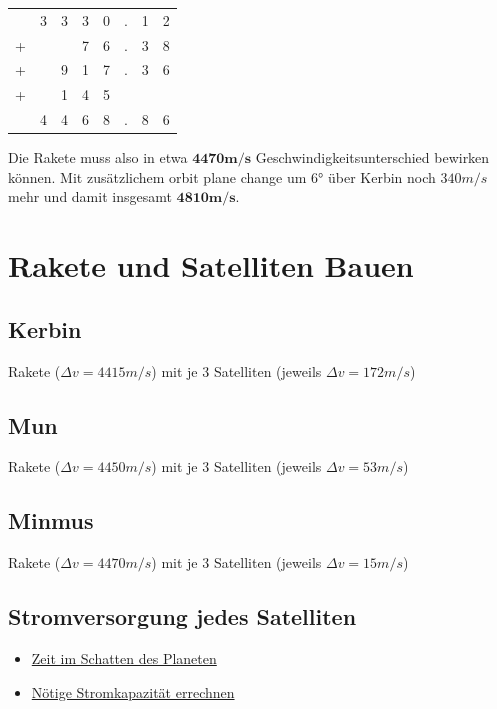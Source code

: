 \documentclass[12pt,paper=A4,numbers=noenddot,bibliography=totoc,listof=totoc,DIV=11,BCOR=1mm]{scrreprt}
\newcommand{\gq}[1]{\glqq #1\grqq} %
\begin{document}
\begin{flushright}
\begin{tabular}{c@{\,}c@{\,}c@{\,}c@{\,}c@{\,}c@{\,}c@{\,}c}
  & 3 & 3 & 3 & 0 & . & 1 & 2 \\ 
+ &   &   & 7 & 6 & . & 3 & 8 \\ 
+ &   & 9 & 1 & 7 & . & 3 & 6 \\ 
+ &   & 1 & 4 & 5 &   &   &   \\ 
\hline 
  & 4 & 4 & 6 & 8 & . & 8 & 6 \\ 
\end{tabular}
\end{flushright}

\begin{flushleft}
Die Rakete muss also in etwa $\mathbf{4470m/s}$ Geschwindigkeitsunterschied bewirken können.
Mit zusätzlichem \gq{orbit plane change} um 6° über Kerbin noch $340m/s$ mehr und damit insgesamt $\mathbf{4810m/s}$.
\end{flushleft}



\chapter{Rakete und Satelliten Bauen}

\section*{Kerbin}
Rakete ($\Delta v = 4415m/s$) mit je 3 Satelliten (jeweils $\Delta v = 172m/s$) \\
\section*{Mun}
Rakete ($\Delta v = 4450m/s$) mit je 3 Satelliten (jeweils $\Delta v = 53m/s$) \\
\section*{Minmus}
Rakete ($\Delta v = 4470m/s$) mit je 3 Satelliten (jeweils $\Delta v = 15m/s$) \\
\section*{Stromversorgung jedes Satelliten}
\begin{itemize}
\item \href{https://youtu.be/T123t3lR_Ck}{Zeit im Schatten des Planeten}
\item \href{https://youtu.be/5VPLfKv4jKc}{Nötige Stromkapazität errechnen}
\end{itemize}
\end{document}
